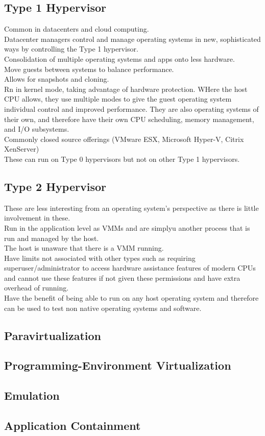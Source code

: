\documentclass[oneside]{book}
\begin{document}
            \subsection{Type 1 Hypervisor}
                Common in datacenters and cloud computing.\\
                Datacenter managers control and manage operating systems in new, sophisticated ways by controlling the Type 1
                hypervisor.\\
                Consolidation of multiple operating systems and apps onto less hardware.\\
                Move guests between systems to balance performance.\\
                Allows for snapshots and cloning.\\
                Rn in kernel mode, taking advantage of hardware protection. WHere the host CPU allows, they 
                use multiple modes to give the guest operating system individual control and improved performance.
                They are also operating systems of their own, and therefore have their own CPU scheduling,
                memory management, and I/O subsystems.\\
                Commonly closed source offerings (VMware ESX, Microsoft Hyper-V, Citrix XenServer)\\
                These can run on Type 0 hypervisors but not on other Type 1 hypervisors.\\
            \subsection{Type 2 Hypervisor}
                These are less interesting from an operating system's perspective as there is little involvement 
                in these.\\
                Run in the application level as VMMs and are simplyu another process that is run and managed by the host.\\
                The host is unaware that there is a VMM running.\\
                Have limits not associated with other types such as requiring superuser/administrator to access hardware assistance
                features of modern CPUs and cannot use these features if not given these permissions and have extra overhead
                of running.\\
                Have the benefit of being able to run on any host operating system and therefore can be used to test non native
                operating systems and software.
            \subsection{Paravirtualization}
            \subsection{Programming-Environment Virtualization}
            \subsection{Emulation}
            \subsection{Application Containment}
    \listoffigures
\end{document}
